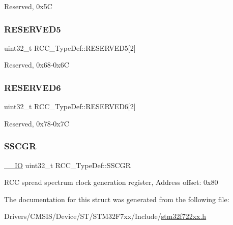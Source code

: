 Reserved, 0x5C \mbox{\label{struct_r_c_c___type_def_af9159a971013ef0592be8be3e256a344}} 
\subsubsection{\texorpdfstring{RESERVED5}{RESERVED5}}
{\footnotesize\ttfamily uint32\+\_\+t R\+C\+C\+\_\+\+Type\+Def\+::\+R\+E\+S\+E\+R\+V\+E\+D5\mbox{[}2\mbox{]}}

Reserved, 0x68-\/0x6C \mbox{\label{struct_r_c_c___type_def_a30cfd1a2f2eb931bacfd2be965e53d1b}} 
\subsubsection{\texorpdfstring{RESERVED6}{RESERVED6}}
{\footnotesize\ttfamily uint32\+\_\+t R\+C\+C\+\_\+\+Type\+Def\+::\+R\+E\+S\+E\+R\+V\+E\+D6\mbox{[}2\mbox{]}}

Reserved, 0x78-\/0x7C \mbox{\label{struct_r_c_c___type_def_a52270ad1423c68cd536f62657bb669f5}} 
\subsubsection{\texorpdfstring{SSCGR}{SSCGR}}
{\footnotesize\ttfamily \mbox{\hyperlink{core__sc300_8h_aec43007d9998a0a0e01faede4133d6be}{\+\_\+\+\_\+\+IO}} uint32\+\_\+t R\+C\+C\+\_\+\+Type\+Def\+::\+S\+S\+C\+GR}

R\+CC spread spectrum clock generation register, Address offset\+: 0x80 

The documentation for this struct was generated from the following file\+:\begin{DoxyCompactItemize}
\item 
Drivers/\+C\+M\+S\+I\+S/\+Device/\+S\+T/\+S\+T\+M32\+F7xx/\+Include/\mbox{\hyperlink{stm32f722xx_8h}{stm32f722xx.\+h}}\end{DoxyCompactItemize}
